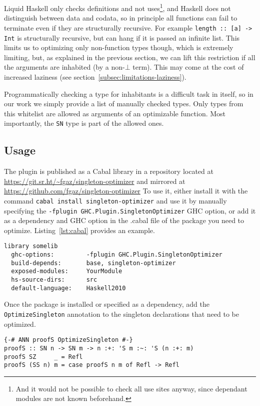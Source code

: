 Liquid Haskell only checks definitions and not uses\footnote{And it would not be possible to check all use sites anyway, since dependant modules are not known beforehand.}, and Haskell does not distinguish between data and codata, so in principle all functions can fail to terminate even if they are structurally recursive. For example \texttt{length :: [a] -> Int} is structurally recursive, but can hang if it is passed an infinite list.
This limits us to optimizing only non-function types though, which is extremely limiting, but, as explained in the previous section, we can lift this restriction if all the arguments are inhabited (by a non-$\bot$ term).
This may come at the cost of increased laziness (see section~\ref{subsec:limitations-laziness}).

Programmatically checking a type for inhabitants is a difficult task in itself, so in our work we simply provide a list of manually checked types.
Only types from this whitelist are allowed as arguments of an optimizable function.
Most importantly, the \texttt{SN} type is part of the allowed ones.

\subsection{Usage}
\label{subsec:usage}

The plugin is published as a Cabal library in a repository located at \url{https://git.sr.ht/~fgaz/singleton-optimizer} and mirrored at \url{https://github.com/fgaz/singleton-optimizer}
To use it, either install it with the command \texttt{cabal install singleton-optimizer} and use it by manually specifying the \texttt{-fplugin GHC.Plugin.SingletonOptimizer} GHC option, or add it as a dependency and GHC option in the .cabal file of the package you need to optimize.
Listing~\ref{lst:cabal} provides an example.

\begin{lstlisting}[label=lst:cabal, caption=Example .cabal stanza]
library somelib
  ghc-options:         -fplugin GHC.Plugin.SingletonOptimizer
  build-depends:       base, singleton-optimizer
  exposed-modules:     YourModule
  hs-source-dirs:      src
  default-language:    Haskell2010
\end{lstlisting}

Once the package is installed or specified as a dependency, add the \texttt{OptimizeSingleton} annotation to the singleton declarations that need to be optimized.

\begin{lstlisting}[caption=Optimizing \texttt{proofS}]
{-# ANN proofS OptimizeSingleton #-}
proofS :: SN n -> SN m -> n :+: 'S m :~: 'S (n :+: m)
proofS SZ     _ = Refl
proofS (SS n) m = case proofS n m of Refl -> Refl
\end{lstlisting}

